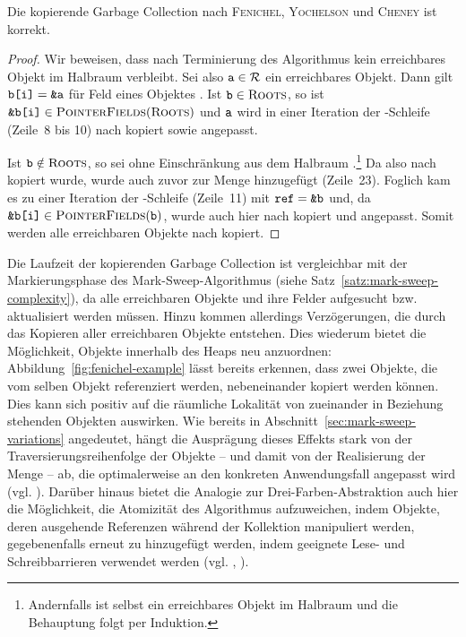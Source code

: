 \begin{mybox}
\begin{satz}
	Die kopierende Garbage Collection nach \textsc{Fenichel}, \textsc{Yochelson} und \textsc{Cheney} ist korrekt.
\end{satz}
\end{mybox}

\begin{proof}
	Wir beweisen, dass nach Terminierung des Algorithmus kein erreichbares Objekt im Halbraum  verbleibt.
	Sei also $\texttt{a} \in \mathcal{R}$ ein erreichbares Objekt.
	Dann gilt $\texttt{b[i]} = \texttt{\&a}$ für Feld  eines Objektes .
	Ist $\texttt{b} \in \textsc{Roots}$, so ist $\texttt{\&b[i]} \in \textsc{PointerFields}(\textsc{Roots})$ und $\texttt{a}$ wird in einer Iteration der \FOREACH-Schleife (Zeile~8 bis 10) nach  kopiert sowie  angepasst.
	
	Ist $\texttt{b} \notin \textsc{Roots}$, so sei  ohne Einschränkung aus dem Halbraum .\footnote{Andernfalls ist  selbst ein erreichbares Objekt im Halbraum  und die Behauptung folgt per Induktion.}
	Da  also nach  kopiert wurde, wurde  auch zuvor zur Menge  hinzugefügt (Zeile~23).
	Foglich kam es zu einer Iteration der \WHILE-Schleife (Zeile~11) mit $\texttt{ref} = \texttt{\&b}$ und, da $\texttt{\&b[i]} \in \textsc{PointerFields}(\texttt{b})$, wurde auch hier  nach  kopiert und  angepasst.
	Somit werden alle erreichbaren Objekte nach  kopiert.	
\end{proof}

Die Laufzeit der kopierenden Garbage Collection ist vergleichbar mit der Markierungsphase des Mark-Sweep-Algorithmus (siehe Satz~\ref{satz:mark-sweep-complexity}), da alle erreichbaren Objekte und ihre Felder aufgesucht bzw. aktualisiert werden müssen.
Hinzu kommen allerdings Verzögerungen, die durch das Kopieren aller erreichbaren Objekte entstehen.
Dies wiederum bietet die Möglichkeit, Objekte innerhalb des Heaps neu anzuordnen:
Abbildung~\ref{fig:fenichel-example} lässt bereits erkennen, dass zwei Objekte, die vom selben Objekt referenziert werden, nebeneinander kopiert werden können.
Dies kann sich positiv auf die räumliche Lokalität von zueinander in Beziehung stehenden Objekten auswirken.
Wie bereits in Abschnitt~\ref{sec:mark-sweep-variations} angedeutet, hängt die Ausprägung dieses Effekts stark von der Traversierungsreihenfolge der Objekte -- und damit von der Realisierung der Menge  -- ab, die optimalerweise an den konkreten Anwendungsfall angepasst wird (vgl. \cite[Kap. 4.2]{handbook}).
Darüber hinaus bietet die Analogie zur Drei-Farben-Abstraktion auch hier die Möglichkeit, die Atomizität des Algorithmus aufzuweichen, indem Objekte, deren ausgehende Referenzen während der Kollektion manipuliert werden, gegebenenfalls erneut zu  hinzugefügt werden, indem geeignete Lese- und Schreibbarrieren verwendet werden (vgl. \cite[S. 129]{kero2007}, \cite[S. 41]{hosking2006}).

